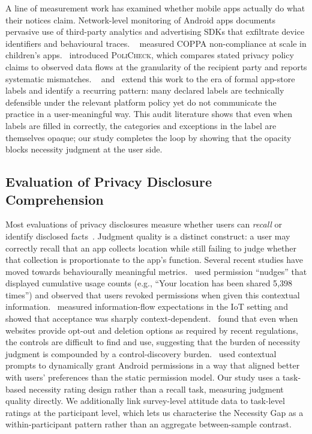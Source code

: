 \documentclass[11pt,a4paper]{article}
\begin{document}
A line of measurement work has examined whether mobile apps actually do
what their notices claim. Network-level monitoring of Android apps
\citep{englehardt:narayanan:2016,razaghpanah:etal:2018,ren:etal:2018}
documents pervasive use of third-party analytics and advertising SDKs
that exfiltrate device identifiers and behavioural traces.
~\citet{reyes:etal:2018} measured COPPA non-compliance at scale in
children's apps.~\citet{andow:etal:2020} introduced \textsc{PoliCheck},
which compares stated privacy policy claims to observed data flows at
the granularity of the recipient party and reports systematic mismatches.
~\citet{kollnig:etal:2022} and~\citet{koch:etal:2022} extend this work
to the era of formal app-store labels and identify a recurring pattern:
many declared labels are technically defensible under the relevant
platform policy yet do not communicate the practice in a user-meaningful
way. This audit literature shows that even when labels are filled in
correctly, the categories and exceptions in the label are themselves
opaque; our study completes the loop by showing that the opacity blocks
necessity judgment at the user side.

\subsection{Evaluation of Privacy Disclosure Comprehension}
\label{subsec:rw-evaluation}

Most evaluations of privacy disclosures measure whether users can
\emph{recall} or identify disclosed
facts~\citep{kelley:etal:2010,zhang:etal:2022,reidenberg:etal:2015}.
Judgment quality is a distinct construct: a user may correctly recall
that an app collects location while still failing to judge whether that
collection is proportionate to the app's function. Several recent
studies have moved towards behaviourally meaningful
metrics.~\citet{almuhimedi:etal:2015} used permission ``nudges'' that
displayed cumulative usage counts (e.g., ``Your location has been shared
5{,}398 times'') and observed that users revoked permissions when given
this contextual information.~\citet{naeini:etal:2017} measured
information-flow expectations in the IoT setting and showed that
acceptance was sharply context-dependent.~\citet{habib:etal:2020} found
that even when websites provide opt-out and deletion options as required
by recent regulations, the controls are difficult to find and use,
suggesting that the burden of necessity judgment is compounded by a
control-discovery burden.~\citet{wijesekera:etal:2017} used contextual
prompts to dynamically grant Android permissions in a way that aligned
better with users' preferences than the static permission model. Our
study uses a task-based necessity rating design rather than a recall
task, measuring judgment quality directly. We additionally link
survey-level attitude data to task-level ratings at the participant
level, which lets us characterise the Necessity Gap as a
within-participant pattern rather than an aggregate between-sample
contrast.
\end{document}
